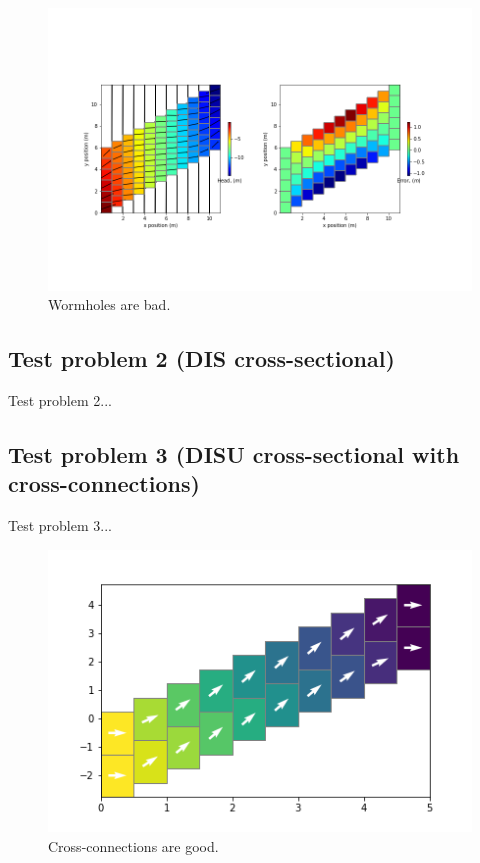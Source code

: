 \documentclass{article}
\begin{document}
\begin{figure}
	\begin{center}
	\includegraphics{../figures/worm-sstp-x-a-head.png}
	\caption{Wormholes are bad.}
	\label{fig:worm-sstp-x-a-head}
	\end{center}
\end{figure}

\subsection{Test problem 2 (DIS cross-sectional)}

Test problem 2...

\subsection{Test problem 3 (DISU cross-sectional with cross-connections)}

Test problem 3...

\begin{figure}
	\begin{center}
	\includegraphics{../figures/mymodel-head.png}
	\caption{Cross-connections are good.}
	\label{fig:mymodel-head}
	\end{center}
\end{figure}
\end{document}
